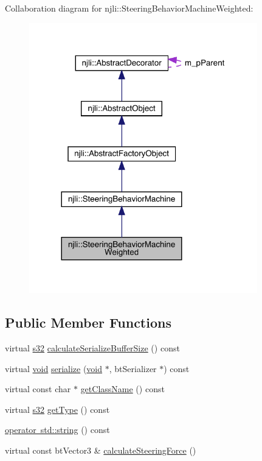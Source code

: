 Collaboration diagram for njli\+:\+:Steering\+Behavior\+Machine\+Weighted\+:\nopagebreak
\begin{figure}[H]
\begin{center}
\leavevmode
\includegraphics[width=281pt]{classnjli_1_1_steering_behavior_machine_weighted__coll__graph}
\end{center}
\end{figure}
\subsection*{Public Member Functions}
\begin{DoxyCompactItemize}
\item 
virtual \mbox{\hyperlink{_util_8h_aa62c75d314a0d1f37f79c4b73b2292e2}{s32}} \mbox{\hyperlink{classnjli_1_1_steering_behavior_machine_weighted_a7e689fadcc5631e53fe3b9ec972ad70e}{calculate\+Serialize\+Buffer\+Size}} () const
\item 
virtual \mbox{\hyperlink{_thread_8h_af1e856da2e658414cb2456cb6f7ebc66}{void}} \mbox{\hyperlink{classnjli_1_1_steering_behavior_machine_weighted_a384f337048a8483eeb7189f8fef0b664}{serialize}} (\mbox{\hyperlink{_thread_8h_af1e856da2e658414cb2456cb6f7ebc66}{void}} $\ast$, bt\+Serializer $\ast$) const
\item 
virtual const char $\ast$ \mbox{\hyperlink{classnjli_1_1_steering_behavior_machine_weighted_a96746378cde3e401742eda55cbe5b23c}{get\+Class\+Name}} () const
\item 
virtual \mbox{\hyperlink{_util_8h_aa62c75d314a0d1f37f79c4b73b2292e2}{s32}} \mbox{\hyperlink{classnjli_1_1_steering_behavior_machine_weighted_a4d9fcf0548dc29c760dad537716c645e}{get\+Type}} () const
\item 
\mbox{\hyperlink{classnjli_1_1_steering_behavior_machine_weighted_aa36b0042df33a2e63ec790e5a29ee183}{operator std\+::string}} () const
\item 
virtual const bt\+Vector3 \& \mbox{\hyperlink{classnjli_1_1_steering_behavior_machine_weighted_a14497ce93400f5c851a4ff412f2e050a}{calculate\+Steering\+Force}} ()
\end{DoxyCompactItemize}
